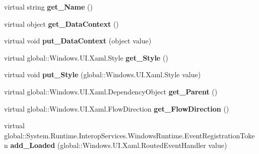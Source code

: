 \begin{DoxyCompactItemize}
virtual string {\bfseries get\+\_\+\+Name} ()
\item 
\mbox{\label{class_windows_1_1_u_i_1_1_xaml_1_1_framework_element_ad0581fd837683c9421c10618e8889baa}} 
virtual object {\bfseries get\+\_\+\+Data\+Context} ()
\item 
\mbox{\label{class_windows_1_1_u_i_1_1_xaml_1_1_framework_element_a16dcfc1dee5715c7ad1fcf1583da3c52}} 
virtual void {\bfseries put\+\_\+\+Data\+Context} (object value)
\item 
\mbox{\label{class_windows_1_1_u_i_1_1_xaml_1_1_framework_element_a3480ff37b1b5a51609195d9f75bc85af}} 
virtual global\+::\+Windows.\+U\+I.\+Xaml.\+Style {\bfseries get\+\_\+\+Style} ()
\item 
\mbox{\label{class_windows_1_1_u_i_1_1_xaml_1_1_framework_element_a7d0ee354514743a6657ebcd74e705b0a}} 
virtual void {\bfseries put\+\_\+\+Style} (global\+::\+Windows.\+U\+I.\+Xaml.\+Style value)
\item 
\mbox{\label{class_windows_1_1_u_i_1_1_xaml_1_1_framework_element_a7efd68b56519cedcc2cedefdcf122ff7}} 
virtual global\+::\+Windows.\+U\+I.\+Xaml.\+Dependency\+Object {\bfseries get\+\_\+\+Parent} ()
\item 
\mbox{\label{class_windows_1_1_u_i_1_1_xaml_1_1_framework_element_ac5ff3ae585984d3cd556a50d71f62b36}} 
virtual global\+::\+Windows.\+U\+I.\+Xaml.\+Flow\+Direction {\bfseries get\+\_\+\+Flow\+Direction} ()
\item 
\mbox{\label{class_windows_1_1_u_i_1_1_xaml_1_1_framework_element_afcc0c9f29c9a0911255d8104c61f97d4}} 
virtual global\+::\+System.\+Runtime.\+Interop\+Services.\+Windows\+Runtime.\+Event\+Registration\+Token {\bfseries add\+\_\+\+Loaded} (global\+::\+Windows.\+U\+I.\+Xaml.\+Routed\+Event\+Handler value)
\item 
\mbox{\label{class_windows_1_1_u_i_1_1_xaml_1_1_framework_element_ae8bbc1aa6042890029fe272abd141c94}} 

\end{DoxyCompactItemize}
